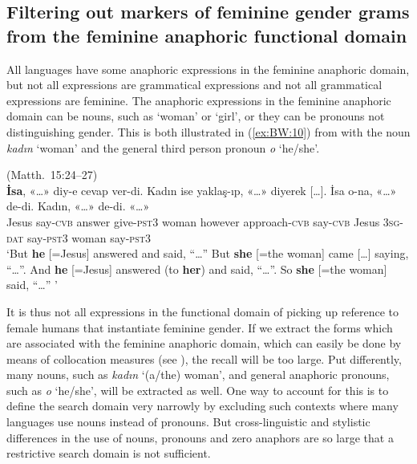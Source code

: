 \documentclass[output=collectionpaper]{langsci/langscibook}
\begin{document}
\subsection{Filtering out markers of feminine gender grams from the feminine anaphoric functional domain}
\label{sec:BW:2.4}

All languages have some anaphoric expressions in the feminine anaphoric domain, but not all expressions are grammatical expressions and not all grammatical expressions are feminine. The anaphoric expressions in the feminine anaphoric domain can be nouns, such as ‘woman’ or ‘girl’, or they can be pronouns not distinguishing gender. This is both illustrated in (\ref{ex:BW:10}) from  with the noun \textit{kadın} ‘woman’ and the general third person pronoun \textit{o} ‘he/she’.

\eas\label{ex:BW:10}
 (Matth.~15:24–27)\\
\gll \textbf{İsa}, «\ldots»	diy-e	cevap	ver-di.	Kadın	ise	yaklaş-ıp, «\ldots»	diyerek [\ldots]. İsa	o-na, «\ldots»	de-di.	Kadın, «\ldots»	de-di. «\ldots»\\
Jesus	{} say-\textsc{cvb}	answer	give-\textsc{pst3}	woman	however	approach-\textsc{cvb} {} say-\textsc{cvb} {} Jesus	\textsc{3sg-dat} {}	say-\textsc{pst3}	woman {}	say-\textsc{pst3} {}\\
\glt ‘But \textbf{he} [=Jesus] answered and said, “\ldots” But \textbf{she} [=the woman] came [\ldots] saying, “\ldots”. And \textbf{he} [=Jesus] answered (to \textbf{her}) and said, “\ldots”. So \textbf{she} [=the woman] said, “\ldots” ’
\zs

It is thus not all expressions in the functional domain of picking up reference to female humans that instantiate feminine gender. If we extract the forms which are associated with the feminine anaphoric domain, which can easily be done by means of collocation measures (see ), the recall will be too large. Put differently, many nouns, such as  \textit{kadın} ‘(a/the) woman’, and general anaphoric pronouns, such as  \textit{o} ‘he/she’, will be extracted as well. One way to account for this is to define the search domain very narrowly by excluding such contexts where many languages use nouns instead of pronouns. But cross-linguistic and stylistic differences in the use of nouns, pronouns and zero anaphors are so large that a restrictive search domain is not sufficient.
\end{document}
